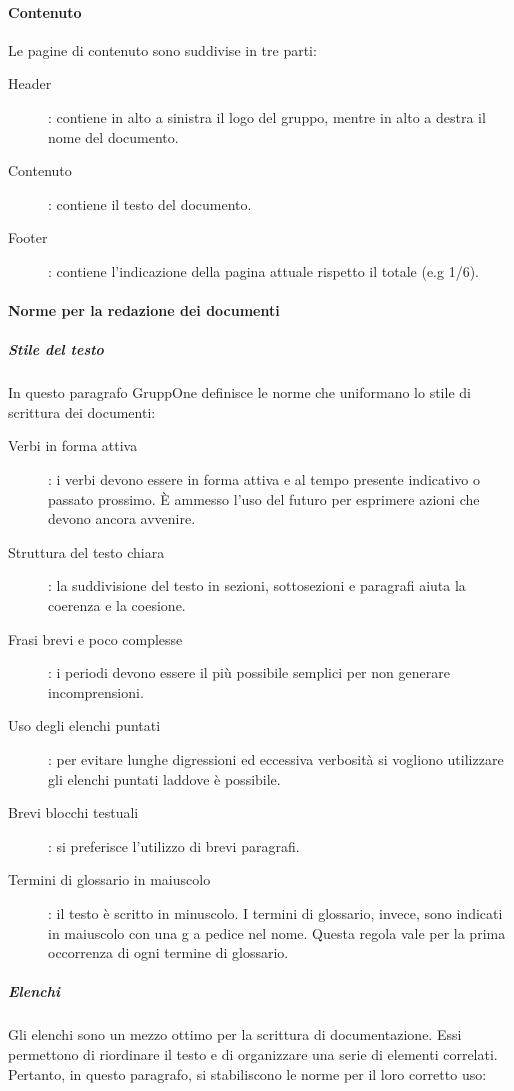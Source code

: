 \documentclass[../norme-di-progetto.tex]{subfiles}
\begin{document}
\paragraph{Contenuto}%
\label{par:contenuto}
Le pagine di contenuto sono suddivise in tre parti:
\begin{description}
  \item [Header]: contiene in alto a sinistra il logo del gruppo, mentre in alto a destra il nome del documento.
  \item [Contenuto]: contiene il testo del documento.
  \item [Footer]: contiene l'indicazione della pagina attuale rispetto il totale (e.g 1/6).
\end{description}

\paragraph{Norme per la redazione dei documenti}%
\label{par:norme_per_la_redazione_dei_documenti}

\subparagraph{Stile del testo}%
\label{subp:stile_del_testo}
In questo paragrafo GruppOne definisce le norme che uniformano lo stile di scrittura dei documenti:
\begin{description}
  \item [Verbi in forma attiva]: i verbi devono essere in forma attiva e al tempo presente indicativo o passato prossimo. È ammesso l'uso del futuro per esprimere azioni che devono ancora avvenire.
  \item [Struttura del testo chiara]: la suddivisione del testo in sezioni, sottosezioni e paragrafi aiuta la coerenza e la coesione.
  \item [Frasi brevi e poco complesse]: i periodi devono essere il più possibile semplici per non generare incomprensioni.
  \item [Uso degli elenchi puntati]: per evitare lunghe digressioni ed eccessiva verbosità si vogliono utilizzare gli elenchi puntati laddove è possibile.
  \item [Brevi blocchi testuali]: si preferisce l'utilizzo di brevi paragrafi.
  \item [Termini di glossario in maiuscolo]: il testo è scritto in minuscolo. I termini di glossario, invece, sono indicati in maiuscolo con una g a pedice nel nome. Questa regola vale per la prima occorrenza di ogni termine di glossario.
\end{description}

\subparagraph{Elenchi }%
\label{subp:elenchi}
Gli elenchi sono un mezzo ottimo per la scrittura di documentazione. Essi permettono di riordinare il testo e di organizzare una serie di elementi correlati. Pertanto, in questo paragrafo, si stabiliscono le norme per il loro corretto uso:
\end{document}
